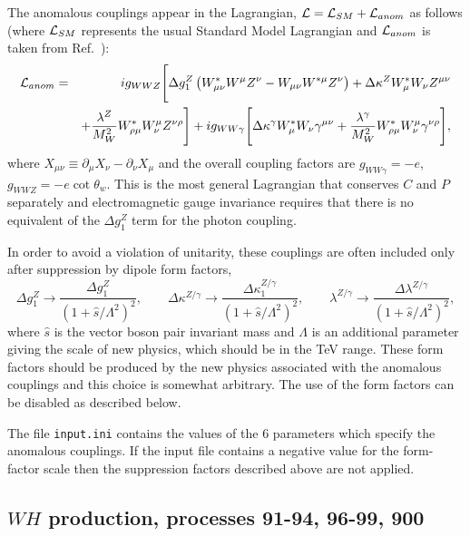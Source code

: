 The anomalous couplings appear in the Lagrangian,
${\cal L} = {\cal L}_{SM} + {\cal L}_{anom}$ as follows
(where ${\cal L}_{SM}$ represents the usual Standard Model Lagrangian and
${\cal L}_{anom}$ is taken from Ref.~\cite{Dixon:1999di}):
\begin{eqnarray}
{\cal L}_{anom} & = & i g_{WWZ} \Biggl[
 \Delta g_1^Z \left( W^*_{\mu\nu}W^\mu Z^\nu - W_{\mu\nu}W^{*\mu} Z^\nu \right)
+\Delta\kappa^Z W^*_\mu W_\nu Z^{\mu\nu} \nonumber \\
 & &+
 \frac{\lambda^Z}{M_W^2} W^*_{\rho\mu} W^\mu_\nu Z^{\nu\rho} \Biggr]
+i g_{WW\gamma} \Biggl[ 
 \Delta\kappa^\gamma W^*_\mu W_\nu \gamma^{\mu\nu}
+\frac{\lambda^\gamma}{M_W^2} W^*_{\rho\mu} W^\mu_\nu\gamma^{\nu\rho}
 \Biggr], \nonumber
\end{eqnarray}
where $X_{\mu\nu} \equiv \partial_\mu X_{\nu} - \partial_\nu X_{\mu}$
and the overall coupling factors are $g_{WW\gamma}=-e$,
$g_{WWZ}=-e\cot\theta_w$.
This is the most general Lagrangian that conserves $C$ and $P$
separately and electromagnetic gauge invariance requires that there
is no equivalent of the $\Delta g_1^Z$ term for the photon coupling.

In order to avoid a violation of unitarity, these couplings are often
included only after suppression by dipole form factors,
\begin{displaymath}
\Delta g_1^Z \rightarrow \frac{\Delta g_1^Z}{(1+\hat{s}/\Lambda^2)^2}, \qquad
\Delta \kappa^{Z/\gamma} \rightarrow
 \frac{\Delta \kappa_1^{Z/\gamma}}{(1+\hat{s}/\Lambda^2)^2}, \qquad
\lambda^{Z/\gamma} \rightarrow
 \frac{\Delta \lambda^{Z/\gamma}}{(1+\hat{s}/\Lambda^2)^2},
\end{displaymath}
where $\hat{s}$ is the vector boson pair invariant mass and $\Lambda$
is an additional parameter giving the scale of new physics, which should
be in the TeV range.
These form factors should be produced by the new physics associated with the
anomalous couplings and this choice is somewhat arbitrary. The use of the form
factors can be disabled as described below.

The file {\tt input.ini} contains the values of the $6$ parameters
which specify the anomalous couplings.
If the input file contains a negative value for the form-factor scale
then the suppression factors described above are not applied.

\subsection{$WH$ production, processes 91-94, 96-99, 900}
\label{subsec:wh}

